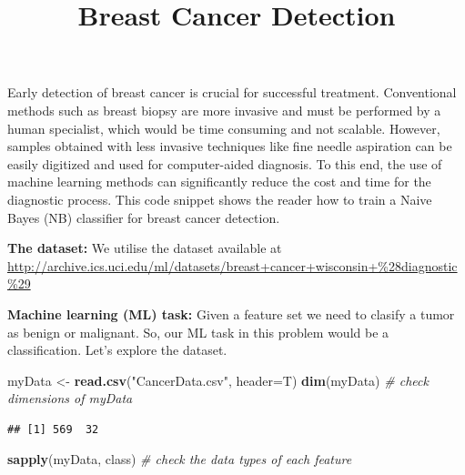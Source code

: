 \documentclass[]{article}
\title{Breast Cancer Detection}
\author{}
\date{}
\newenvironment{Shaded}{\begin{snugshade}}{\end{snugshade}}
\newcommand{\CommentTok}[1]{\textcolor[rgb]{0.56,0.35,0.01}{\textit{#1}}}
\newcommand{\DataTypeTok}[1]{\textcolor[rgb]{0.13,0.29,0.53}{#1}}
\newcommand{\KeywordTok}[1]{\textcolor[rgb]{0.13,0.29,0.53}{\textbf{#1}}}
\newcommand{\NormalTok}[1]{#1}
\newcommand{\StringTok}[1]{\textcolor[rgb]{0.31,0.60,0.02}{#1}}
\begin{document}
\maketitle

Early detection of breast cancer is crucial for successful treatment.
Conventional methods such as breast biopsy are more invasive and must be
performed by a human specialist, which would be time consuming and not
scalable. However, samples obtained with less invasive techniques like
fine needle aspiration can be easily digitized and used for
computer-aided diagnosis. To this end, the use of machine learning
methods can significantly reduce the cost and time for the diagnostic
process. This code snippet shows the reader how to train a Naive Bayes
(NB) classifier for breast cancer detection.

\textbf{The dataset:} We utilise the dataset available at
\url{http://archive.ics.uci.edu/ml/datasets/breast+cancer+wisconsin+\%28diagnostic\%29}

\textbf{Machine learning (ML) task:} Given a feature set we need to
clasify a tumor as benign or malignant. So, our ML task in this problem
would be a classification. Let's explore the dataset.

\begin{Shaded}
\begin{Highlighting}[]
\NormalTok{myData <-}\StringTok{ }\KeywordTok{read.csv}\NormalTok{(}\StringTok{"CancerData.csv"}\NormalTok{, }\DataTypeTok{header=}\NormalTok{T)}
\KeywordTok{dim}\NormalTok{(myData) }\CommentTok{# check dimensions of myData}
\end{Highlighting}
\end{Shaded}

\begin{verbatim}
## [1] 569  32
\end{verbatim}

\begin{Shaded}
\begin{Highlighting}[]
\KeywordTok{sapply}\NormalTok{(myData, class) }\CommentTok{# check the data types of each feature}
\end{Highlighting}
\end{Shaded}
\end{document}
